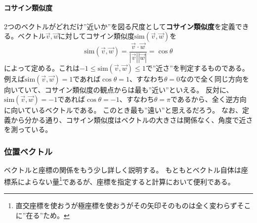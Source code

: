 \documentclass[10pt]{jsreport}
\theoremstyle{definition}%
\newcommand{\vc}[1]{\overrightarrow{#1}}%
\numberwithin{equation}{section}%
\begin{document}
\paragraph{コサイン類似度}
2つのベクトルがどれだけ''近いか''を図る尺度として{\bf コサイン類似度}を定義できる。ベクトル$\vc{v},\vc{w}$に対してコサイン類似度$\mathrm{sim}(\vc{v},\vc{w})$を
\begin{equation}
\label{cossim} \mathrm{sim}(\vc{v},\vc{w})=\frac{\vc{v}\cdot \vc{w}}{|\vc{v}||\vc{w}|}=\cos{\theta}
\end{equation}
によって定める。これは$-1\leq \mathrm{sim}(\vc{v},\vc{w})\leq 1$で''近さ''を判定するものである。例えば$\mathrm{sim}(\vc{v},\vc{w})=1$であれば$\cos{\theta}=1$、すなわち$\theta=0$なので全く同じ方向を向いていて、コサイン類似度の観点からは最も''近い''といえる。
反対に、$\mathrm{sim}(\vc{v},\vc{w})=-1$であれば$\cos{\theta}=-1$、すなわち$\theta=\pi$であるから、全く逆方向に向いているベクトルである。
このとき最も''遠い''と思えるだろう。
なお、定義から分かる通り、コサイン類似度はベクトルの大きさは関係なく、角度で近さを測っている。
\subsubsection{位置ベクトル}
ベクトルと座標の関係をもう少し詳しく説明する。
もともとベクトル自体は座標系によらない量\footnote{直交座標を使おうが極座標を使おうがその矢印そのものは全く変わらずそこに''在る''ため。}であるが、座標を指定すると計算において便利である。
\end{document}
